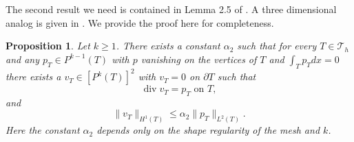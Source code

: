 \documentclass[11pt]{amsart}
\numberwithin{equation}{section}
\newcommand{\dive}{\operatorname{div}}
\newcommand{\Th}{\mathcal{T}_h}
\newtheorem{proposition}{Proposition}
\theoremstyle{definition}
\begin{document}
The second result we need is contained in Lemma 2.5 of \cite{vogelius1983right}. A three dimensional analog is given in \cite{neilan2015discrete}. We provide the proof here for completeness.
\begin{proposition}
Let $k \ge 1$. There exists a constant $\alpha_2$ such that for every $T \in \Th$ and any $p_T \in P^{k-1}(T)$ with $p$ vanishing on the vertices of $T$ and $\int_T p_T dx=0$ there exists a $v_T \in [P^k(T)]^2$ with $v_T =0$ on $\partial T$ such that  
\begin{equation*}
\dive v_T =p_T \text{ on } T,
\end{equation*}
and
\begin{equation*}
\|v_T\|_{H^1(T)} \le \alpha_2 \|p_T\|_{L^2(T)}.
\end{equation*}
Here the constant $\alpha_2$  depends only
on the shape regularity of the mesh and $k$. 
\end{proposition}
\end{document}
